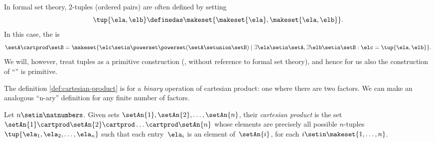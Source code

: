 \begin{remark}
    \label{rem:formal-cartesian}
    In formal set theory, 2-tuples (ordered pairs) are often defined by setting
    \begin{equation}
        \label{eq:ordered-pair}
        \tup{\ela, \elb} \definedas \makeset{ \makeset{\ela }, \makeset{ \ela, \elb } }.
    \end{equation}
    In this case, the  is
    \begin{equation}
        \setA \cartprod \setB = \makeset{ \elc \setin\powerset \powerset (\setA \setunion \setB) \mid \exists \ela \setin\setA, \exists \elb \setin\setB : \elc = \tup{\ela, \elb} }.
    \end{equation}
    We will, however, treat tuples as a primitive construction (\ie, without reference to formal set theory), and hence for us also the construction of ``'' is primitive.
\end{remark}

The definition \cref{def:cartesian-product} is for a \emph{binary} operation of cartesian product: one where there are two factors.
We can make an analogous ``n-ary'' definition for any finite number of factors.

\begin{ctdefinition}
    \label{def:n-ary-cartesian-product}
    Let $n \setin \natnumbers$.
    Given sets $\setAn{1}, \setAn{2}, \dots, \setAn{n}$, their \emph{cartesian product} is the set $\setAn{1} \cartprod \setAn{2} \cartprod \dots \cartprod \setAn{n}$ whose elements are precisely all possible $n$-tuples~$\tup{\ela_{1}, \ela_{2}, \dots, \ela_{n}}$ such that each entry~$\ela_{i}$ is an element of~$\setAn{i}$, for each $i \setin \makeset{1, \dots, n}$.
\end{ctdefinition}
